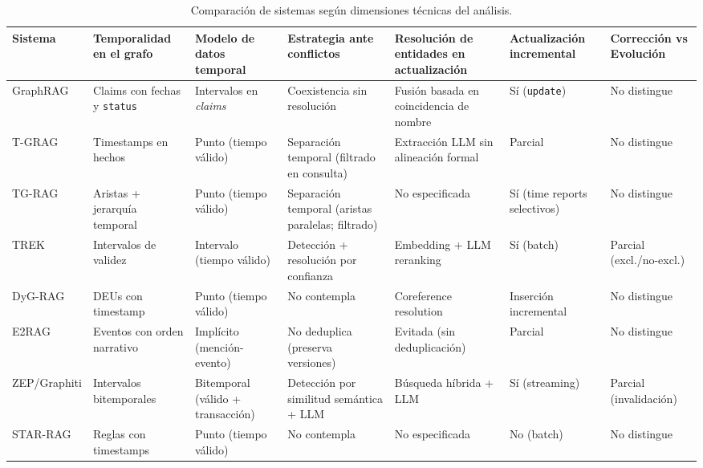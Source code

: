 \begin{table}[htbp]
\centering
\begingroup
\scriptsize
\setlength{\tabcolsep}{3pt}
\renewcommand{\arraystretch}{1.15}
\begin{tabular}{@{}p{1.55cm}p{1.8cm}p{1.9cm}p{2.45cm}p{2.2cm}p{1.45cm}p{1.75cm}@{}}
\toprule
Sistema & Temporalidad en el grafo & Modelo de datos temporal & Estrategia ante conflictos & Resolución de entidades en actualización & Actualización incremental & Corrección vs Evolución \\
\midrule
GraphRAG \cite{edge2024local} & Claims con fechas y \texttt{status} & Intervalos en \emph{claims} & Coexistencia sin resolución & Fusión basada en coincidencia de nombre & Sí (\texttt{update}) & No distingue \\
T-GRAG \cite{tgrag2025} & Timestamps en hechos & Punto (tiempo válido) & Separación temporal (filtrado en consulta) & Extracción LLM sin alineación formal & Parcial & No distingue \\
TG-RAG \cite{tg_rag2025} & Aristas + jerarquía temporal & Punto (tiempo válido) & Separación temporal (aristas paralelas; filtrado) & No especificada & Sí (time reports selectivos) & No distingue \\
TREK \cite{trek2025} & Intervalos de validez & Intervalo (tiempo válido) & Detección + resolución por confianza & Embedding + LLM reranking & Sí (batch) & Parcial (excl./no-excl.) \\
DyG-RAG \cite{dyg_rag2025} & DEUs con timestamp & Punto (tiempo válido) & No contempla & Coreference resolution & Inserción incremental & No distingue \\
E2RAG \cite{e2rag2025} & Eventos con orden narrativo & Implícito (mención-evento) & No deduplica (preserva versiones) & Evitada (sin deduplicación) & Parcial & No distingue \\
ZEP/Graphiti \cite{zep2025} & Intervalos bitemporales & Bitemporal (válido + transacción) & Detección por similitud semántica + LLM & Búsqueda híbrida + LLM & Sí (streaming) & Parcial (invalidación) \\
STAR-RAG \cite{star_rag2025} & Reglas con timestamps & Punto (tiempo válido) & No contempla & No especificada & No (batch) & No distingue \\
\bottomrule
\end{tabular}
\endgroup
\caption{Comparación de sistemas según dimensiones técnicas del análisis.}
\label{tab:state-of-the-art-comparison}
\end{table}

